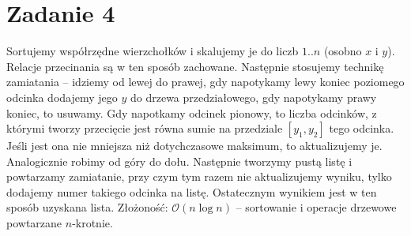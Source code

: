 \documentclass[12pt, a4paper]{article}
\newcommand{\MCALO}{\mathcal{O}}
\begin{document}
\section*{Zadanie 4}
Sortujemy współrzędne wierzchołków i skalujemy je do liczb $1..n$ (osobno $x$
i $y$). Relacje przecinania są w ten sposób zachowane. Następnie stosujemy
technikę zamiatania -- idziemy od lewej do prawej, gdy napotykamy lewy koniec
poziomego odcinka dodajemy jego $y$ do drzewa przedziałowego, gdy napotykamy
prawy koniec, to usuwamy. Gdy napotkamy odcinek pionowy, to liczba odcinków,
z którymi tworzy przecięcie jest równa sumie na przedziale $[y_1,y_2]$ tego
odcinka. Jeśli jest ona nie mniejsza niż dotychczasowe maksimum, to
aktualizujemy je. Analogicznie robimy od góry do dołu. Następnie tworzymy pustą
listę i powtarzamy zamiatanie, przy czym tym razem nie aktualizujemy wyniku,
tylko dodajemy numer takiego odcinka na listę. Ostatecznym wynikiem jest w ten
sposób uzyskana lista. Złożoność: $\MCALO(n\log{n})$ -- sortowanie i operacje
drzewowe powtarzane $n$-krotnie.
\end{document}
